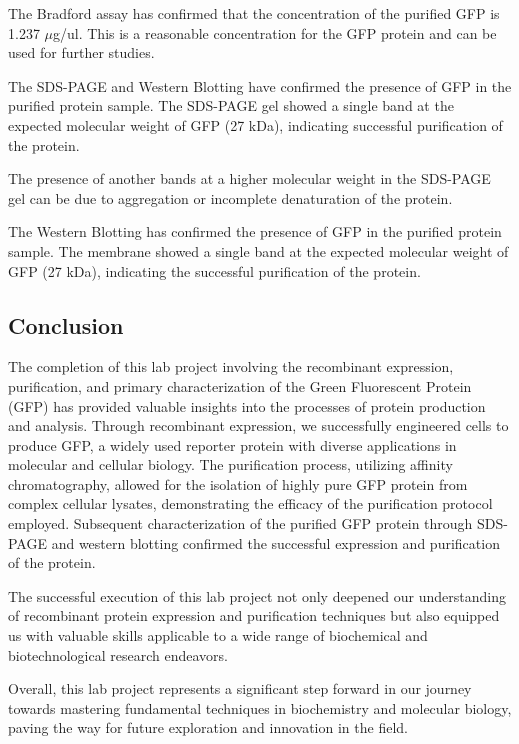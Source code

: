 \documentclass[twoside]{article}
\begin{document}
\begin{multicols}{2}
The Bradford assay has confirmed that the concentration of the purified GFP is 1.237 $\mu$g/ul.
This is a reasonable concentration for the GFP protein and can be used for further studies.

The SDS-PAGE and Western Blotting have confirmed the presence of GFP in the purified protein sample.
The SDS-PAGE gel showed a single band at the expected molecular weight of GFP (27 kDa), indicating successful purification of the protein.

The presence of another bands at a higher molecular weight in the SDS-PAGE gel can be due to aggregation or incomplete denaturation of the protein.

The Western Blotting has confirmed the presence of GFP in the purified protein sample.
The membrane showed a single band at the expected molecular weight of GFP (27 kDa), indicating the successful purification of the protein.


\subsection*{Conclusion}
The completion of this lab project involving the recombinant expression, purification, 
and primary characterization of the Green Fluorescent Protein (GFP) has provided valuable 
insights into the processes of protein production and analysis. Through recombinant expression, 
we successfully engineered cells to produce GFP, a widely used reporter protein with diverse 
applications in molecular and cellular biology. The purification process, utilizing affinity 
chromatography, allowed for the isolation of highly pure GFP protein from complex cellular lysates, 
demonstrating the efficacy of the purification protocol employed. Subsequent characterization of the 
purified GFP protein through SDS-PAGE and western blotting confirmed the successful expression and
purification of the protein.

The successful execution of this lab project not only deepened our understanding of recombinant protein expression and purification 
techniques but also equipped us with valuable skills applicable to a wide range of biochemical 
and biotechnological research endeavors. 

Overall, this lab project represents a significant step forward in our journey towards mastering fundamental 
techniques in biochemistry and molecular biology, paving the way for future exploration and innovation in the field.




\end{multicols}
\end{document}
